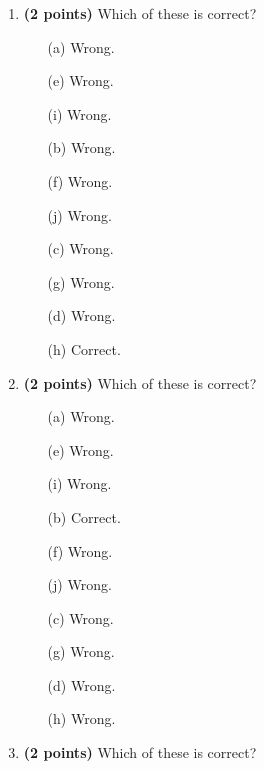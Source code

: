 \documentclass[12pt]{amsart}
\begin{document}
\newpage
\begin{enumerate}
\item {\bf (2 points)} 
 Which of these is correct?

\begin{minipage}[t]{1.0\linewidth}\begin{multicols}{4}\begin{itemize}\item[(a)]  Wrong. \item[(e)]  Wrong. \item[(i)]  Wrong. \item[(b)]  Wrong. \item[(f)]  Wrong. \item[(j)]  Wrong. \item[(c)]  Wrong. \item[(g)]  Wrong. \item[] \item[(d)]  Wrong. \item[(h)]  Correct. \item[] \end{itemize}\end{multicols}\end{minipage} \vfill 
\item {\bf (2 points)} 
 Which of these is correct?

\begin{minipage}[t]{1.0\linewidth}\begin{multicols}{4}\begin{itemize}\item[(a)]  Wrong. \item[(e)]  Wrong. \item[(i)]  Wrong. \item[(b)]  Correct. \item[(f)]  Wrong. \item[(j)]  Wrong. \item[(c)]  Wrong. \item[(g)]  Wrong. \item[] \item[(d)]  Wrong. \item[(h)]  Wrong. \item[] \end{itemize}\end{multicols}\end{minipage} \vfill 
\item {\bf (2 points)} 
 Which of these is correct?


\end{enumerate}
\end{document}
